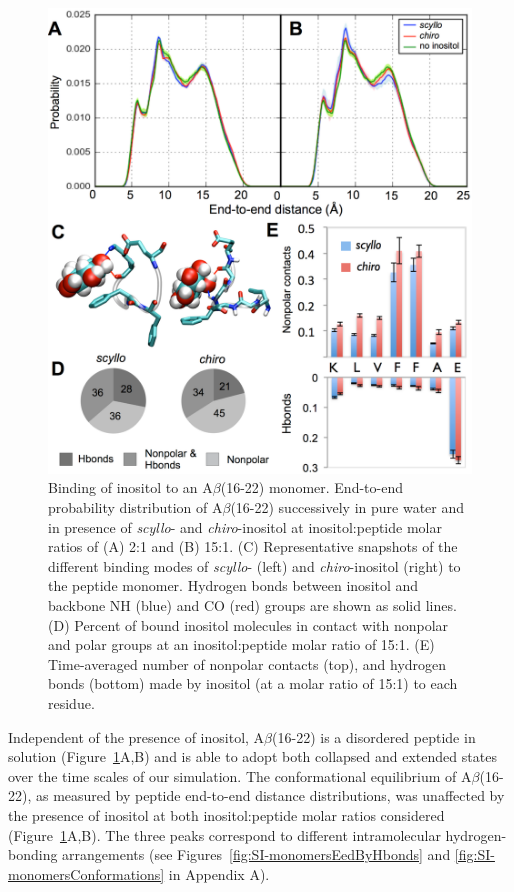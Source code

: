 \begin{figure}
\centering
\includegraphics[width=14.6cm]{figures/results2/inos2_figures_monomers_revised.pdf}
\caption[Binding of inositol to an A$\beta$(16-22) monomer]{Binding of inositol to an A$\beta$(16-22) monomer.  End-to-end probability distribution of A$\beta$(16-22) successively in pure water and in presence of \emph{scyllo}- and \emph{chiro}-inositol at inositol:peptide molar ratios of (A) 2:1 and (B) 15:1.  (C) Representative snapshots of the different binding modes of \emph{scyllo}- (left) and \emph{chiro}-inositol (right)  to the peptide monomer. Hydrogen bonds between inositol and backbone NH (blue) and CO (red) groups are shown as solid lines. (D) Percent of bound inositol molecules in contact with nonpolar and polar groups at an inositol:peptide molar ratio of 15:1. (E) Time-averaged number of nonpolar contacts (top), and hydrogen bonds (bottom) made by inositol  (at a molar ratio of 15:1) to each residue.}
\label{fig:monomers}
\end{figure}

Independent of the presence of inositol, A$\beta$(16-22) is a disordered peptide in solution (Figure~\ref{fig:monomers}A,B) and is able to adopt both collapsed and extended states over the time scales of our simulation. The conformational equilibrium of A$\beta$(16-22), as measured by peptide end-to-end distance distributions, was unaffected by the presence of inositol at both inositol:peptide molar ratios considered (Figure~\ref{fig:monomers}A,B). The three peaks correspond to different intramolecular hydrogen-bonding arrangements (see Figures~\ref{fig:SI-monomersEedByHbonds} and \ref{fig:SI-monomersConformations} in Appendix A).

